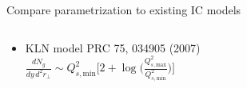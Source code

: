 \documentclass[xcolor=dvipsnames, aspectratio=169]{beamer}
\begin{document}
\begin{frame}[t]{Compare parametrization to existing IC models}
\begin{columns}[T]
\begin{column}{0.6\textwidth}
\begin{itemize}
{                      PRC 93, 024907 (2016)} \\
                      {\scriptsize after brief free streaming phase} \\[1em] 
                      $\displaystyle \frac{dE_T}{dy\,d^2r_\perp}  \sim 
                      \frac{K_\text{sat}}{\pi} p_\text{sat}^3(K_\text{sat}, 
                      \beta; T_A, T_B)$
                \item KLN model \; {\scriptsize \color{theme} PRC 75, 
                     034905 (2007)} \\[1em] $\displaystyle 
                     \frac{dN_g}{dy\,d^2r_\perp} \sim Q^2_{s,\text{min}} \bigg[2 + 
                     \log \bigg(\frac{Q^2_{s,\text{max}}}{Q^2_{s,\text{min}}}
                     \bigg) \bigg]$
            \end{itemize}
        \end{column}
    \end{columns}
\end{frame}
\end{document}

